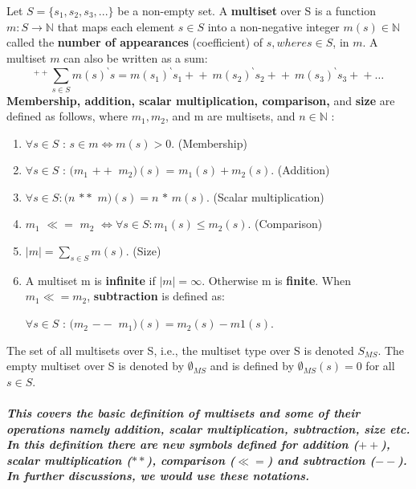 \begin{defs}
	\label{defs:preliminaries_Multiset}
	Let $S = \{ s_{1}, s_{2}, s_{3}, . . . \}$ be a non-empty set. A \textbf{multiset} over S is
	a function $m : S \rightarrow \mathbb{N}$ that maps each element $s \in S$ into a non-negative integer $m(s) \in \mathbb{N}$ called the \textbf{number of appearances} (coefficient) of $s, where s \in S$, in $m$. A multiset $m$ can also be written as a sum:
	\begin{equation*}
	_{}^{++}\sum\limits_{s \in S}^{ } {m(s)}^{\backprime}s = {m(s_{1})}^{\backprime} s_{1} +\!\!+ \ {m(s_{2})}^{\backprime}s_{2} +\!\!+ \ {m(s_{3})}^{\backprime} s_{3} +\!\!+ \ldots
	\end{equation*}
	\textbf{Membership, addition, scalar multiplication, comparison,} and \textbf{size} are defined
	as follows, where $m_{1}, m_{2}$, and m are multisets, and $n \in \mathbb{N}$ :
	\begin{enumerate}
		\item $\forall s \in S$ : $s \in m \Leftrightarrow  m(s) > 0$. (Membership)
		\item $\forall s \in S$ : $(m_{1}$ $+\!+$ $m_{2})(s)$ = $m_{1}(s) + m_{2}(s)$. (Addition)
		\item $\forall s \in S : (n$ $\ast\!\ast$ $m)(s) = n$ $\ast$ $m(s)$. (Scalar multiplication)
		\item $m_{1}$ $\ll=$ $m_{2}$ $\Leftrightarrow \forall s \in S : m_{1}(s) \leq m_{2}(s)$. (Comparison)
		\item $\left | m \right | = \sum\limits_{s \in S} m(s)$. (Size)
		\item A multiset m is \textbf{infinite} if $\left | m \right | = \infty$. Otherwise m is \textbf{finite}. When $m_{1} \ll= m_{2}$, \textbf{subtraction} is defined as:
		\begin{center}
			$\forall s \in S$ : $(m_{2}$ $--$ $m_{1})(s) = m_{2}(s) - m{1}(s).$
		\end{center}
	\end{enumerate}
	The set of all multisets over S, i.e., the multiset type over S is denoted $S_{MS}$. The
	empty multiset over S is denoted by $\emptyset_{MS}$ and is defined by $\emptyset_{MS}(s) = 0$ for all $s \in S$.
\end{defs}

\subparagraph*{\textnormal{This covers the basic definition of multisets and some of their operations namely addition, scalar multiplication, subtraction, size etc. In this definition there are new symbols defined for addition ($+\!+$), scalar multiplication ($\ast\!\ast$), comparison ($\ll=$) and subtraction ($--$). In further discussions, we would use these notations.}}

